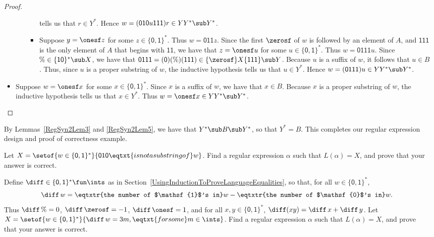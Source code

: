 \begin{proof}
\begin{itemize}
\begin{itemize}
\begin{itemize}
      tells us that $r\in Y^*$.  Hence
      $w=(\mathsf{010}u\mathsf{111})r\in YY^*\sub Y^*$.
    \item Suppose $y=\onesf z$ for some $z\in\mathsf{\{0,1\}}^*$.
      Thus $w=\mathsf{011}z$.  Since the first $\zerosf$ of $w$ is
      followed by an element of $A$, and $\mathsf{111}$ is the only
      element of $A$ that begins with $\mathsf{11}$, we have that
      $z=\onesf u$ for some $u\in\mathsf{\{0,1\}}^*$.  Thus
      $w=\mathsf{0111}u$.  Since $\%\in\{\mathsf{10}\}^*\sub X$, we
      have that
      $\mathsf{0111}=\mathsf{(0)(\%)(111)}\in\{\zerosf\}X\{\mathsf{111}\}\sub
      Y$.  Because $u$ is a suffix of $w$, it follows that $u\in B$.
      Thus, since $u$ is a proper substring of $w$, the inductive
      hypothesis tells us that $u\in Y^*$.  Hence
      $w=\mathsf{(0111)}u\in YY^*\sub Y^*$.
    \end{itemize}
  \end{itemize}

\item Suppose $w=\onesf x$ for some $x\in\mathsf{\{0,1\}}^*$.  Since
  $x$ is a suffix of $w$, we have that $x\in B$.  Because $x$ is a
  proper substring of $w$, the inductive hypothesis tells us that
  $x\in Y^*$.  Thus $w=\onesf x\in YY^*\sub Y^*$.
\end{itemize}
\end{proof}

By Lemmas~\ref{RegSyn2Lem3} and \ref{RegSyn2Lem5}, we have that $Y^*\sub
B\sub Y^*$, so that $Y^*=B$.  This completes our regular expression
design and proof of correctness example.

\begin{exercise}
Let $X=\setof{w\in\{\mathsf{0,1}\}^*}{\mathsf{010}\eqtxt{is not a
    substring of}w}$.  Find a regular expression $\alpha$ such that
$L(\alpha)=X$, and prove that your answer is correct.
\end{exercise}

\begin{exercise}
Define $\diff\in\{\mathsf{0,1}\}^*\fun\ints$ as in
Section~\ref{UsingInductionToProveLanguageEqualities}, so
that, for all $w\in\{\mathsf{0,1}\}^*$,
\begin{displaymath}
\diff\,w =
\eqtxtr{the number of $\mathsf{1}$'s in}w -
\eqtxtr{the number of $\mathsf{0}$'s in}w .
\end{displaymath}
Thus $\diff\,\%=0$, $\diff\,\zerosf = -1$, $\diff\,\onesf = 1$, and
for all $x,y\in\{\mathsf{0,1}\}^*$, $\diff(xy) = \diff\,x + \diff\,y$.
Let $X=\setof{w\in\{\mathsf{0,1}\}^*}{\diff\,w=3m,\eqtxt{for some}m\in\ints}$.
Find a regular expression $\alpha$ such that $L(\alpha)=X$, and
prove that your answer is correct.
\end{exercise}

